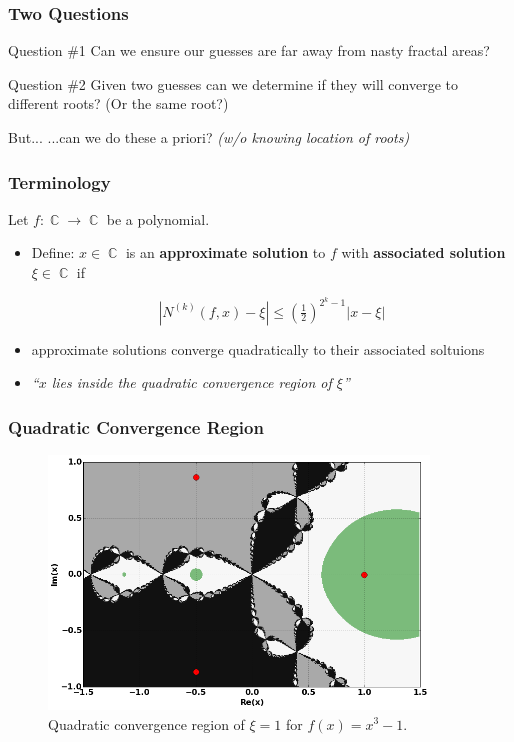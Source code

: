 \documentclass{beamer}
\DeclareMathOperator{\CC}{\mathbb{C}}
\begin{document}
\begin{frame}
  \frametitle{Two Questions}

  \begin{block}{Question \#1}
    Can we ensure our guesses are far away from nasty fractal areas?
  \end{block}

  \pause

  \begin{block}{Question \#2}
    Given two guesses can we determine if they will converge to different roots?
    (Or the same root?)
  \end{block}

  \pause

  \begin{block}{But...}
    ...can we do these a priori? {\it (w/o knowing location of roots)}
  \end{block}

\end{frame}



\begin{frame}
  \frametitle{Terminology}

  Let $f : \CC \to \CC$ be a polynomial.

  \begin{itemize}
  \item<1-> Define: $x \in \CC$ is an {\bf approximate solution} to $f$ with
    {\bf associated solution} $\xi \in \CC$ if

    \[
      \left|N^{(k)}(f,x) - \xi\right|
      \leq
      \left(\tfrac{1}{2}\right)^{2^k-1}
      |x - \xi|
    \]
  \item<2-> approximate solutions converge quadratically to their associated
    soltuions
  \item<3-> {\it ``$x$ lies inside the quadratic convergence region of $\xi$''}
  \end{itemize}
\end{frame}




\begin{frame}
  \frametitle{Quadratic Convergence Region}
  \begin{figure}
    \centering
    \includegraphics[width=0.9\textwidth]{images/quadratic.png}
    \caption{Quadratic convergence region of $\xi = 1$ for $f(x) =
      x^3-1$.}
  \end{figure}
\end{frame}
\end{document}
